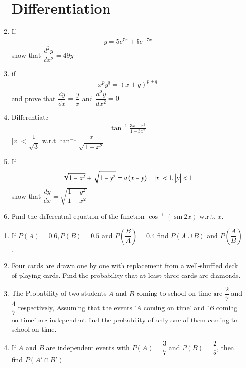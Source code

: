 \documentclass[12pt,-letter paper]{article}
\providecommand{\brak}[1]{\ensuremath{\left(#1\right)}}
\begin{document}
\begin{enumerate}

\section*{Differentiation}

\item If \begin{align*}y= 5e^{7x}+6e^{-7x}\end{align*}  show that $\dfrac{d^2y}{dx^2}=49y$

\item if \begin{align*}x^py^q=(x+y)^{p+q}\end{align*} and prove that $\dfrac{dy}{dx}=\dfrac{y}{x}$ and $\dfrac{d^2y}{dx^2}=0$

\item Differentiate \begin{align*}\tan^{-1}\frac{3x-x^3}{1-3x^2}\end{align*}  $|x|<\dfrac{1}{\sqrt{3}}$ w.r.t $\tan^{-1}\dfrac{x}{\sqrt{1-x^2}}$

\item If \begin{align*}\sqrt{1-x^2}+\sqrt{1-y^2}=a\brak{x-y} \quad\abs{x}<1,\abs{y}<1\end{align*}  show that $\dfrac{dy}{dx}=\sqrt{\dfrac{1-y^2}{1-x^2}}$

\item Find the differential equation of the function $\cos^{-1}(\sin 2x)$ w.r.t. $x$.

\end{enumerate}

\begin{enumerate}

\section*{Probability}		
\item If $P\brak{A}=0.6, P\brak{B}=0.5$ and $P\brak{\dfrac{B}{A}}=0.4$ find $P\brak{A \cup B}$ and $P\brak{\dfrac{A}{B}}$.

\item Four cards are drawn one by one with replacement from a well-shuffled deck of playing cards. Find the probability that at least three cards are diamonds.

\item The Probability of two students $A$ and $B$ coming to school on time are $\dfrac{2}{7}$ and $\dfrac{4}{7}$ respectively, Assuming that the events '$A$ coming on time' and '$B$ coming on time' are independent find the probability of only one of them coming to school on time.

\item If $A$ and $B$ are independent events with $P(A)=\dfrac{3}{7}$ and $P(B)=\dfrac{2}{5}$, then find $P(A' \cap B')$

\end{enumerate} 
\end{document}
